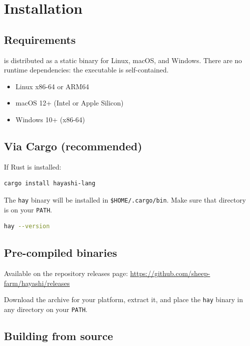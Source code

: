 \chapter{Installation}

\section{Requirements}

\hayashi{} is distributed as a static binary for Linux, macOS, and
Windows. There are no runtime dependencies: the \hay{} executable is
self-contained.

\begin{itemize}
  \item Linux x86-64 or ARM64
  \item macOS 12+ (Intel or Apple Silicon)
  \item Windows 10+ (x86-64)
\end{itemize}

\section{Via Cargo (recommended)}

If Rust is installed:

\begin{lstlisting}[style=inline, language=sh]
cargo install hayashi-lang
\end{lstlisting}

The \texttt{hay} binary will be installed in \texttt{\$HOME/.cargo/bin}.
Make sure that directory is on your \texttt{PATH}.

\begin{lstlisting}[style=inline, language=sh]
hay --version
\end{lstlisting}

\section{Pre-compiled binaries}

Available on the repository releases page:
\url{https://github.com/sheep-farm/hayashi/releases}

Download the archive for your platform, extract it, and place the
\texttt{hay} binary in any directory on your \texttt{PATH}.

\section{Building from source}

